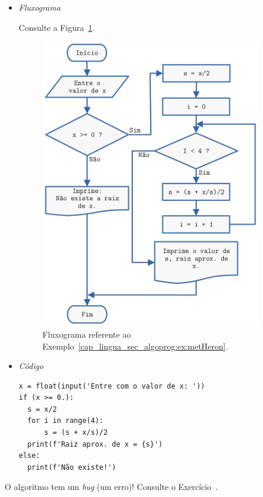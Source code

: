 \begin{ex}
\begin{itemize}
  \item \emph{Fluxograma}
  
    Consulte a Figura~\ref{cap_lingua_sec_algoprog:fig:metHeron}.  

    \begin{figure}[!hp]
      \centering
      \includegraphics[width=3.8in]{./cap_lingua/dados/fig_fluxograma/fig.png}
      \caption{Fluxograma referente ao Exemplo~\ref{cap_lingua_sec_algoprog:ex:metHeron}.}
      \label{cap_lingua_sec_algoprog:fig:metHeron}
    \end{figure}
  
  \item \emph{Código {\python}}

\begin{lstlisting}[caption=metHeron.py,label=cap_lingua_sec_algoprog:cod:metHeron, xrightmargin=2.5em]
x = float(input('Entre com o valor de x: '))
if (x >= 0.):
  s = x/2
  for i in range(4):
      s = (s + x/s)/2
  print(f'Raiz aprox. de x = {s}')
else:
  print(f'Não existe!')
\end{lstlisting}

  \end{itemize}

  O algoritmo tem um \textit{bug} (um erro)! Consulte o Exercício~.
\end{ex}

